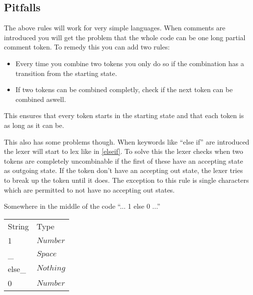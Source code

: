 \subsection{Pitfalls}
The above rules will work for very simple languages. When comments are
introduced you will get the problem that the whole code can be one long partial
comment token. To remedy this you can add two rules:
\begin{itemize}
\item Every time you combine two tokens you only do so if the combination has a
transition from the starting state.
\item If two tokens can be combined completly, check if the next token can be
combined aswell.
\end{itemize}
This ensures that every token starts in the starting state and that each token
is as long as it can be.

This also has some problems though. When keywords like ``else if'' are
introduced the lexer will start to lex like in \cref{elseif}. To solve this the
lexer checks when two tokens are completely uncombinable if the first of these
have an accepting state as outgoing state. If the token don't have an accepting
out state, the lexer tries to break up the token until it does. The exception to
this rule is single characters which are permitted to not have no accepting out
states.
\begin{example}\label{elseif}
Somewhere in the middle of the code ``... 1 else 0 ...''
\begin{center}
\begin{tabular}{ll}
String & Type\\
1 & $Number$\\
\_ & $Space$\\
else\_ & $Nothing$\\
0 & $Number$\\
\end{tabular}
\end{center}
\end{example}


